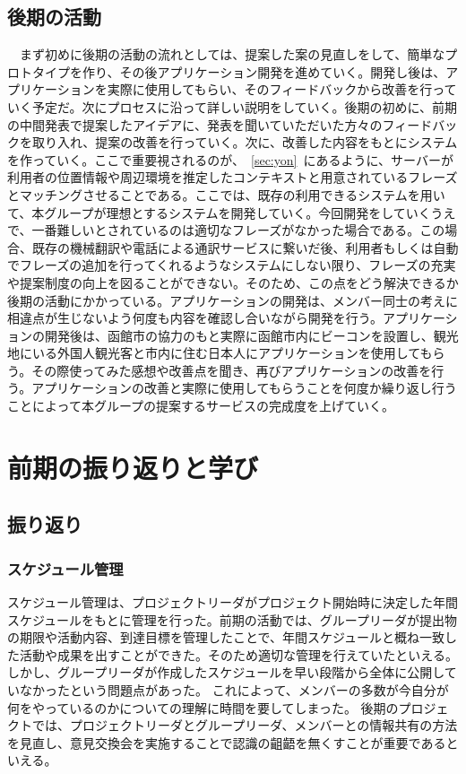 \documentclass[openany,11pt,papersize]{jsbook}
\begin{document}
\section{後期の活動}
　まず初めに後期の活動の流れとしては、提案した案の見直しをして、簡単なプロトタイプを作り、その後アプリケーション開発を進めていく。開発し後は、アプリケーションを実際に使用してもらい、そのフィードバックから改善を行っていく予定だ。次にプロセスに沿って詳しい説明をしていく。後期の初めに、前期の中間発表で提案したアイデアに、発表を聞いていただいた方々のフィードバックを取り入れ、提案の改善を行っていく。次に、改善した内容をもとにシステムを作っていく。ここで重要視されるのが、~\ref{sec:yon}~にあるように、サーバーが利用者の位置情報や周辺環境を推定したコンテキストと用意されているフレーズとマッチングさせることである。ここでは、既存の利用できるシステムを用いて、本グループが理想とするシステムを開発していく。今回開発をしていくうえで、一番難しいとされているのは適切なフレーズがなかった場合である。この場合、既存の機械翻訳や電話による通訳サービスに繋いだ後、利用者もしくは自動でフレーズの追加を行ってくれるようなシステムにしない限り、フレーズの充実や提案制度の向上を図ることができない。そのため、この点をどう解決できるか後期の活動にかかっている。アプリケーションの開発は、メンバー同士の考えに相違点が生じないよう何度も内容を確認し合いながら開発を行う。アプリケーションの開発後は、函館市の協力のもと実際に函館市内にビーコンを設置し、観光地にいる外国人観光客と市内に住む日本人にアプリケーションを使用してもらう。その際使ってみた感想や改善点を聞き、再びアプリケーションの改善を行う。アプリケーションの改善と実際に使用してもらうことを何度か繰り返し行うことによって本グループの提案するサービスの完成度を上げていく。


\chapter{前期の振り返りと学び}

\section{振り返り}

\subsection{スケジュール管理}
スケジュール管理は、プロジェクトリーダがプロジェクト開始時に決定した年間スケジュールをもとに管理を行った。前期の活動では、グループリーダが提出物の期限や活動内容、到達目標を管理したことで、年間スケジュールと概ね一致した活動や成果を出すことができた。そのため適切な管理を行えていたといえる。
しかし、グループリーダが作成したスケジュールを早い段階から全体に公開していなかったという問題点があった。
これによって、メンバーの多数が今自分が何をやっているのかについての理解に時間を要してしまった。
後期のプロジェクトでは、プロジェクトリーダとグループリーダ、メンバーとの情報共有の方法を見直し、意見交換会を実施することで認識の齟齬を無くすことが重要であるといえる。
\end{document}
